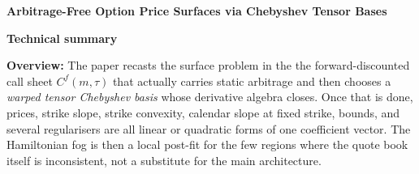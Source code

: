 \documentclass[10pt]{article}
\begin{document}
{\Large\bfseries\color{ink} Arbitrage-Free Option Price Surfaces via Chebyshev Tensor Bases}\par
{\small\color{accent}\textbf{Technical summary}}\par\vspace{2pt}

\begin{keybox}
\textbf{Overview:} The paper recasts the surface problem in the the forward-discounted call sheet $C^f(m,\tau)$ that actually carries static arbitrage and then chooses a \emph{warped tensor Chebyshev basis} whose derivative algebra closes. Once that is done, prices, strike slope, strike convexity, calendar slope at fixed strike, bounds, and several regularisers are all linear or quadratic forms of one coefficient vector. The Hamiltonian fog is then a local post-fit for the few regions where the quote book itself is inconsistent, not a substitute for the main architecture.
\end{keybox}
\end{document}
